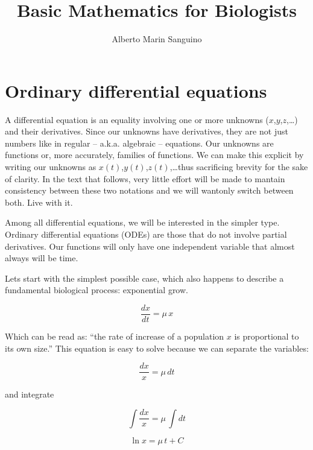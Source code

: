 \documentclass[12pt]{article}
\title{Basic Mathematics for Biologists}
\author{Alberto Marin Sanguino}
\begin{document}
\maketitle

\begin{abstract}

\end{abstract}

\section{Ordinary differential equations}

A differential equation is an equality involving one or more unknowns ($x$,$y$,$z$,\dots) and their derivatives. Since our unknowns have derivatives, they are not just numbers like in regular -- a.k.a. algebraic -- equations. Our unknowns are functions or, more accurately, families of functions. We can make this explicit by writing our unknowns as $x(t)$,$y(t)$,$z(t)$,\dots thus sacrificing brevity for the sake of clarity. In the text that follows, very little effort will be made to mantain consistency between these two notations and we will wantonly switch between both. Live with it.

Among all differential equations, we will be interested in the simpler type. Ordinary differential equations (ODEs) are those that do not involve partial derivatives. Our functions will only have one independent variable that almost always will be time.

Lets start with the simplest possible case, which also happens to describe a fundamental biological process: exponential grow.

\begin{equation}
	\label{odexp}
	\frac{dx}{dt} = \mu \, x
\end{equation}

Which can be read as: ``the rate of increase of a population $x$ is proportional to its own size.'' This equation is easy to solve because we can separate the variables:


\begin{equation}
	\frac{dx}{x} = \mu \, dt
\end{equation}

and integrate

\begin{equation}
	\int \frac{dx}{x} = \mu \, \int  dt
\end{equation}

\begin{equation}
	\ln{x} = \mu \, t + C
\end{equation}
\end{document}
